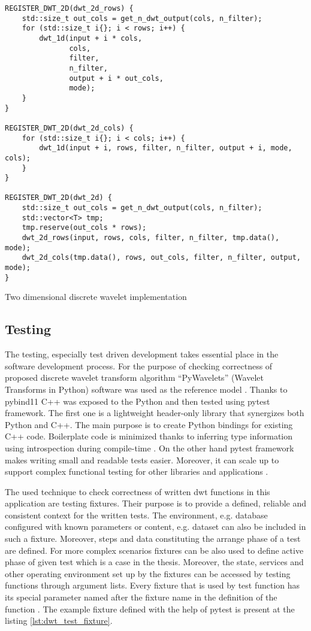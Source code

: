 \begin{listing}[!htb]
\begin{verbatim}
REGISTER_DWT_2D(dwt_2d_rows) {
    std::size_t out_cols = get_n_dwt_output(cols, n_filter);
    for (std::size_t i{}; i < rows; i++) {
        dwt_1d(input + i * cols,
               cols,
               filter,
               n_filter,
               output + i * out_cols,
               mode);
    }
}

REGISTER_DWT_2D(dwt_2d_cols) {
    for (std::size_t i{}; i < cols; i++) {
        dwt_1d(input + i, rows, filter, n_filter, output + i, mode, cols);
    }
}

REGISTER_DWT_2D(dwt_2d) {
    std::size_t out_cols = get_n_dwt_output(cols, n_filter);
    std::vector<T> tmp;
    tmp.reserve(out_cols * rows);
    dwt_2d_rows(input, rows, cols, filter, n_filter, tmp.data(), mode);
    dwt_2d_cols(tmp.data(), rows, out_cols, filter, n_filter, output, mode);
}
\end{verbatim}
\caption{Two dimensional discrete wavelet implementation}
\label{lst:dwt_interface}
\end{listing}

\subsection{Testing}

The testing, especially test driven development takes essential place in the software development
process. For the purpose of checking correctness of proposed discrete wavelet transform algorithm
``PyWavelets'' (Wavelet Transforms in Python) software was used as the reference model \cite{pywavelets}.
Thanks to pybind11 \cite{pybind11} C++ was exposed to the Python and then tested using pytest framework.
The first one is a lightweight header-only library that synergizes both Python and C++. The main purpose
is to create Python bindings for existing C++ code. Boilerplate code is minimized thanks to inferring
type information using introspection during compile-time \cite{pywavelets}. On the other hand pytest framework makes
writing small and readable tests easier. Moreover, it can scale up to support complex functional
testing for other libraries and applications \cite{pytest}.

The used technique to check correctness of written dwt functions in this application are testing
fixtures. Their purpose is to provide a defined, reliable and consistent context for the written tests.
The environment, e.g. database configured with known parameters or content, e.g. dataset can also
be included in such a fixture. Moreover, steps and data constituting the arrange phase of a test
are defined. For more complex scenarios fixtures can be also used to define active phase 
of given test which is a case in the thesis. Moreover, the state, services and other operating
environment set up by the fixtures can be accessed by testing functions through argument lists.
Every fixture that is used by test function has its special parameter named after the fixture name
in the definition of the function \cite{pytest}. The example fixture defined with the help
of pytest is present at the listing \ref{lst:dwt_test_fixture}.

